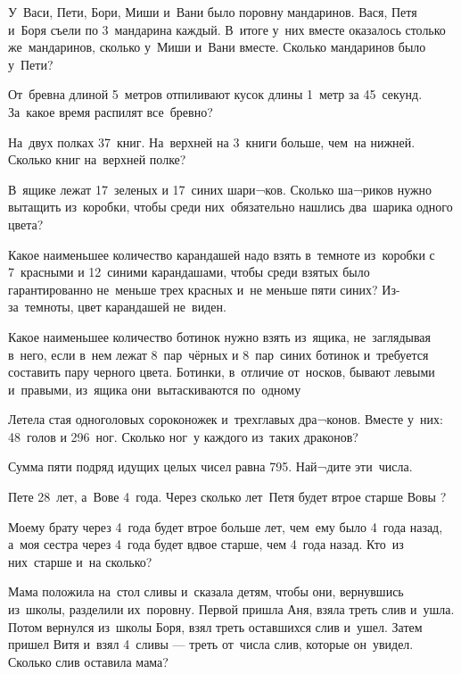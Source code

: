 У~Васи, Пети, Бори, Миши и~Вани было поровну мандаринов. Вася, Петя и~Боря съели по 3~мандарина каждый. 
В~итоге у~них вместе оказалось столько же~мандаринов, сколько у~Миши и~Вани вместе. Сколько мандаринов было у~Пети? 

От~бревна длиной 5~метров отпиливают кусок длины 1~метр за 45~секунд. За~какое время распилят все~бревно? 

На~двух полках 37~книг. На~верхней на 3~книги больше, чем~на нижней. Сколько книг на~верхней полке?  

В~ящике лежат 17~зеленых и 17~синих шари¬ков. Сколько ша¬риков нужно вытащить из~коробки, 
чтобы среди них~обязательно нашлись два~шарика одного цвета? 

Какое наименьшее количество карандашей надо взять в~темноте из~коробки с 7~красными и 12~синими карандашами, 
чтобы среди взятых было гарантированно не~меньше трех красных и~не меньше пяти синих? 
Из-за~темноты, цвет карандашей не~виден. 

Какое наименьшее количество ботинок нужно взять из~ящика, не~заглядывая в~него, 
если в~нем лежат 8~пар~чёрных и 8~пар~синих ботинок и~требуется составить пару черного цвета. 
Ботинки, в~отличие от~носков, бывают левыми и~правыми, из~ящика они~вытаскиваются по~одному

Летела стая одноголовых сороконожек и~трехглавых дра¬конов. Вместе у~них: 48~голов и 296~ног. 
Сколько ног~у каждого из~таких драконов?

Сумма пяти подряд идущих целых чисел равна 795. Най¬дите эти~числа.

Пете 28~лет, а~Вове 4~года. Через сколько лет~Петя будет втрое старше Вовы ?

Моему брату через 4~года будет втрое больше лет, чем~ему было 4~года назад, 
а~моя сестра через 4~года будет вдвое старше, чем 4~года назад. Кто~из них~старше и~на сколько?

Мама положила на~стол сливы и~сказала детям, чтобы они, вернувшись из~школы, разделили их~поровну. 
Первой пришла Аня, взяла треть слив и~ушла. Потом вернулся из~школы Боря, взял треть оставшихся слив и~ушел. 
Затем пришел Витя и~взял 4~сливы — треть от~числа слив, которые он~увидел. Сколько слив оставила мама?


